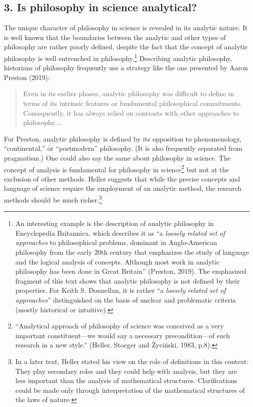 \documentclass[a4paper]{article}
\newcommand\textstyleFootnoteAnchor[1]{\textsuperscript{#1}}
\begin{document}
\subsection{3. Is philosophy in science analytical?}
The unique character of philosophy in science is revealed in its analytic nature. It is well known that the boundaries
between the analytic and other types of philosophy are rather poorly defined, despite the fact that the concept of
analytic philosophy is well entrenched in philosophy.\footnote{An interesting example is the description of analytic
philosophy in Encyclopedia Britannica, which describes it as “a \textit{loosely related set of approaches} to
philosophical problems, dominant in Anglo-American philosophy from the early 20th century that emphasizes the study of
language and the logical analysis of concepts. Although most work in analytic philosophy has been done in Great
Britain” (Preston, 2019). The emphasized fragment of this text shows that analytic philosophy is not defined by their
properties. For Keith S. Donnellan, it is rather “a \textit{loosely related set of approaches}” distinguished on the
basis of unclear and problematic criteria (mostly historical or intuitive).}\textstyleFootnoteAnchor{ }Describing
analytic philosophy, historians of philosophy frequently use a strategy like the one presented by Aaron Preston (2019):


\begin{quotation}
Even in its earlier phases, analytic philosophy was difficult to define in terms of its intrinsic features or
fundamental philosophical commitments. Consequently, it has always relied on contrasts with other approaches to
philosophy.... 

\end{quotation}
For Preston, analytic philosophy is defined by its opposition to phenomenology, “continental,” or “postmodern”
philosophy. (It is also frequently separated from pragmatism.) One could also say the same about philosophy in science.
The concept of analysis is fundamental for philosophy in science\footnote{“Analytical approach of philosophy of science
was conceived as a very important constituent—we would say a necessary precondition—of such research in a new style.”
(Heller, Stoeger and Życiński, 1983, p.8).} but not at the exclusion of other methods. Heller suggests that while the
precise concepts and language of science require the employment of an analytic method, the research methods should be
much richer.\footnote{In a later text, Heller stated his view on the role of definitions in this context: They play
secondary roles and they could help with analysis, but they are less important than the analysis of mathematical
structures. Clarifications could be made only through interpretation of the mathematical structures of the laws of
nature.}
\end{document}
